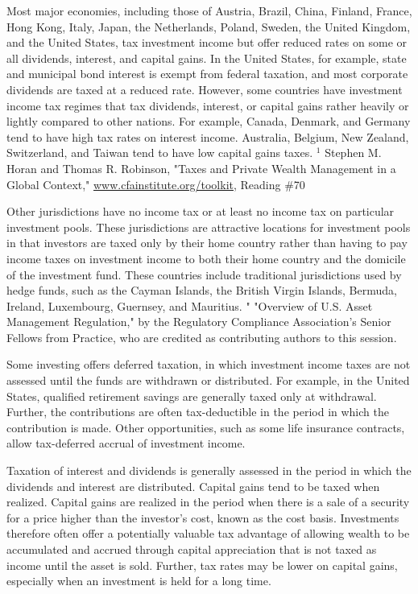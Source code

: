 \documentclass[11pt]{article}
\begin{document}
Most major economies, including those of Austria, Brazil, China, Finland, France, Hong Kong, Italy, Japan, the Netherlands, Poland, Sweden, the United Kingdom, and the United States, tax investment income but offer reduced rates on some or all dividends, interest, and capital gains. In the United States, for example, state and municipal bond interest is exempt from federal taxation, and most corporate dividends are taxed at a reduced rate. However, some countries have investment income tax regimes that tax dividends, interest, or capital gains rather heavily or lightly compared to other nations. For example, Canada, Denmark, and Germany tend to have high tax rates on interest income. Australia, Belgium, New Zealand, Switzerland, and Taiwan tend to have low capital gains taxes. ${ }^{1}$ Stephen M. Horan and Thomas R. Robinson, "Taxes and Private Wealth Management in a Global Context," \href{http://www.cfainstitute.org/toolkit}{www.cfainstitute.org/toolkit}, Reading \#70

Other jurisdictions have no income tax or at least no income tax on particular investment pools. These jurisdictions are attractive locations for investment pools in that investors are taxed only by their home country rather than having to pay income taxes on investment income to both their home country and the domicile of the investment fund. These countries include traditional jurisdictions used by hedge funds, such as the Cayman Islands, the British Virgin Islands, Bermuda, Ireland, Luxembourg, Guernsey, and Mauritius. " "Overview of U.S. Asset Management Regulation," by the Regulatory Compliance Association's Senior Fellows from Practice, who are credited as contributing authors to this session.

Some investing offers deferred taxation, in which investment income taxes are not assessed until the funds are withdrawn or distributed. For example, in the United States, qualified retirement savings are generally taxed only at withdrawal. Further, the contributions are often tax-deductible in the period in which the contribution is made. Other opportunities, such as some life insurance contracts, allow tax-deferred accrual of investment income.

Taxation of interest and dividends is generally assessed in the period in which the dividends and interest are distributed. Capital gains tend to be taxed when realized. Capital gains are realized in the period when there is a sale of a security for a price higher than the investor's cost, known as the cost basis. Investments therefore often offer a potentially valuable tax advantage of allowing wealth to be accumulated and accrued through capital appreciation that is not taxed as income until the asset is sold. Further, tax rates may be lower on capital gains, especially when an investment is held for a long time.
\end{document}
